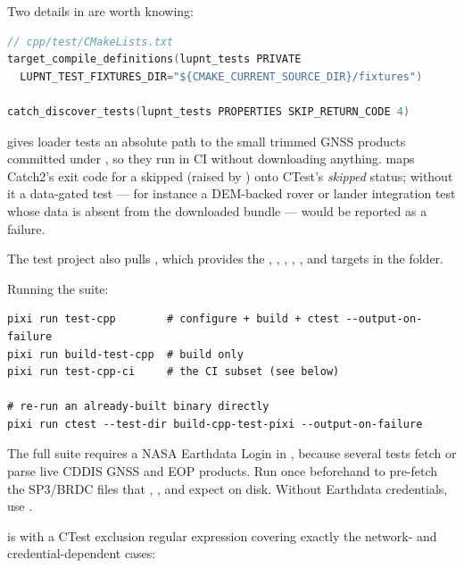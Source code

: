 Two details in  are worth knowing:

\begin{lstlisting}[language=cpp]
// cpp/test/CMakeLists.txt
target_compile_definitions(lupnt_tests PRIVATE
  LUPNT_TEST_FIXTURES_DIR="${CMAKE_CURRENT_SOURCE_DIR}/fixtures")

catch_discover_tests(lupnt_tests PROPERTIES SKIP_RETURN_CODE 4)
\end{lstlisting}

 gives loader tests an absolute path to the
small trimmed GNSS products committed under , so they
run in CI without downloading anything.  maps
Catch2's exit code for a skipped  (raised by )
onto CTest's \emph{skipped} status; without it a data-gated test --- for
instance a DEM-backed rover or lander integration test whose data is absent
from the downloaded bundle --- would be reported as a failure.

The test project also pulls , which
provides the , ,
, , ,
and  targets in the  folder.

Running the suite:

\begin{lstlisting}[language=shell]
pixi run test-cpp        # configure + build + ctest --output-on-failure
pixi run build-test-cpp  # build only
pixi run test-cpp-ci     # the CI subset (see below)

# re-run an already-built binary directly
pixi run ctest --test-dir build-cpp-test-pixi --output-on-failure
\end{lstlisting}

\begin{lupntwarning}
The full suite requires a NASA Earthdata Login in , because
several tests fetch or parse live CDDIS GNSS and EOP products. Run
 once beforehand to pre-fetch the
SP3/BRDC files that ,
, and
 expect on disk. Without
Earthdata credentials, use .
\end{lupntwarning}

 is  with a CTest exclusion regular
expression covering exactly the network- and credential-dependent cases:

